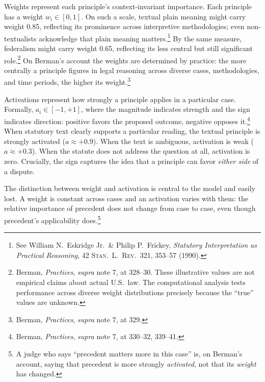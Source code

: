 Weights represent each principle's context-invariant importance. Each
principle has a weight $w_i \in [0,1]$. On such a scale, textual plain meaning might carry weight 0.85, reflecting
its prominence across interpretive methodologies;
even non-textualists acknowledge that plain meaning
matters.\footnote{See William N.\ Eskridge Jr.\ \& Philip P.\ Frickey,
\textit{Statutory Interpretation as Practical Reasoning}, 42 \textsc{Stan.\
L.\ Rev.}\ 321, 353--57 (1990).} By the same measure, federalism might carry weight 0.65, reflecting its
less central but still significant role.\footnote{Berman, \textit{Practices}, \textit{supra} note 7, at 328--30. These illustrative values are not empirical claims about actual
U.S.\ law. The computational analysis tests performance across diverse
weight distributions precisely because the ``true'' values are
unknown.} On Berman's account the weights are determined by practice: the more
centrally a principle figures in legal reasoning across diverse cases,
methodologies, and time periods, the higher its weight.\footnote{Berman, \textit{Practices}, \textit{supra} note 7, at 329.}

Activations represent how strongly a principle applies in a particular
case. Formally, $a_i \in [-1, +1]$, where the magnitude indicates
strength and the sign indicates direction: positive favors the proposed
outcome, negative opposes it.\footnote{Berman, \textit{Practices}, \textit{supra} note 7, at 330--32, 339--41.} When
statutory text clearly supports a particular reading, the textual
principle is strongly activated ($a \approx +0.9$). When the text is
ambiguous, activation is weak ($a \approx +0.3$). When the statute does
not address the question at all, activation is zero. Crucially, the sign captures the idea that a principle can favor
\textit{either side} of a dispute.

The distinction between weight and activation is central to the model and
easily lost. A weight is constant across cases and an activation varies with them:
the relative importance of precedent does not change from case to case, even
though precedent's applicability does.\footnote{A judge who says ``precedent
matters more in this case'' is, on Berman's account, saying that precedent is
more strongly \textit{activated}, not that its \textit{weight} has changed.}

